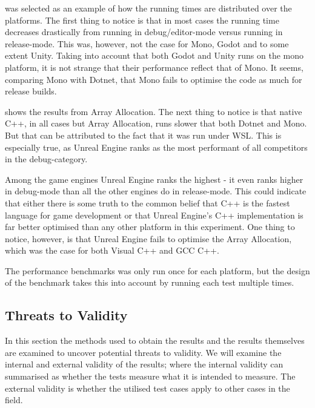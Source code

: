  was selected as an example of how the running times are distributed over the platforms. The first thing to notice is that in most cases the running time decreases drastically from running in debug/editor-mode versus running in release-mode. This was, however, not the case for Mono, Godot and to some extent Unity. Taking into account that both Godot and Unity runs on the mono platform, it is not strange that their performance reflect that of Mono. It seems, comparing Mono with Dotnet, that Mono fails to optimise the code as much for release builds.

 shows the results from Array Allocation. The next thing to notice is that native C++, in all cases but Array Allocation, runs slower that both Dotnet and Mono.  But that can be attributed to the fact that it was run under \ac{WSL}. This is especially true, as Unreal Engine ranks as the most performant of all competitors in the debug-category.


Among the game engines Unreal Engine ranks the highest - it even ranks higher in debug-mode than all the other engines do in release-mode. This could indicate that either there is some truth to the common belief that C++ is the fastest language for game development or that Unreal Engine's C++ implementation is far better optimised than any other platform in this experiment. 
One thing to notice, however, is that Unreal Engine fails to optimise the Array Allocation, which was the case for both Visual C++ and \ac{GCC} C++.


The performance benchmarks was only run once for each platform, but the design of the benchmark takes this into account by running each test multiple times.

\subsection{Threats to Validity} \label{sec:micro:threats}
In this section the methods used to obtain the results and the results themselves are examined to uncover potential threats to validity. We will examine the internal and external validity of the results; where the internal validity can summarised as whether the tests measure what it is intended to measure. The external validity is whether the utilised test cases apply to other cases in the field.

